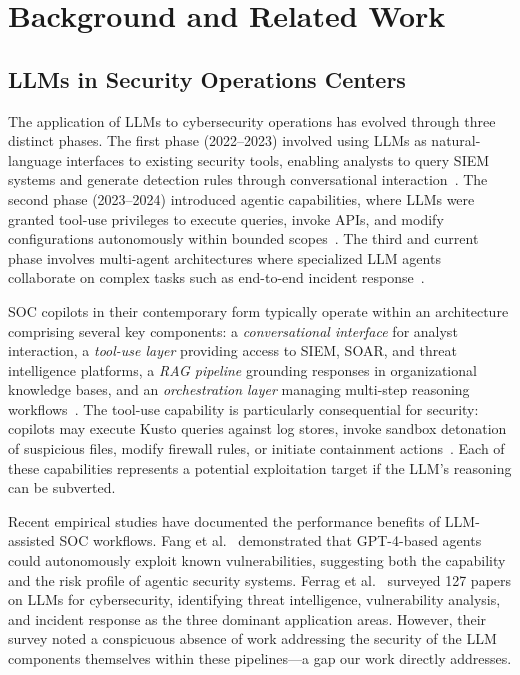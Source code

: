 \documentclass[journal,twoside]{IEEEtran}
\begin{document}
\section{Background and Related Work}
\label{sec:background}

\subsection{LLMs in Security Operations Centers}
\label{sec:bg_soc}

The application of LLMs to cybersecurity operations has evolved through three distinct phases. The first phase (2022--2023) involved using LLMs as natural-language interfaces to existing security tools, enabling analysts to query SIEM systems and generate detection rules through conversational interaction~\cite{ferrag2024llmcyber}. The second phase (2023--2024) introduced agentic capabilities, where LLMs were granted tool-use privileges to execute queries, invoke APIs, and modify configurations autonomously within bounded scopes~\cite{fang2024llmagents}. The third and current phase involves multi-agent architectures where specialized LLM agents collaborate on complex tasks such as end-to-end incident response~\cite{wu2024autogen,hong2024metagpt}.

SOC copilots in their contemporary form typically operate within an architecture comprising several key components: a \emph{conversational interface} for analyst interaction, a \emph{tool-use layer} providing access to SIEM, SOAR, and threat intelligence platforms, a \emph{RAG pipeline} grounding responses in organizational knowledge bases, and an \emph{orchestration layer} managing multi-step reasoning workflows~\cite{microsoft2024copilot}. The tool-use capability is particularly consequential for security: copilots may execute Kusto queries against log stores, invoke sandbox detonation of suspicious files, modify firewall rules, or initiate containment actions~\cite{xu2024llmsec}. Each of these capabilities represents a potential exploitation target if the LLM's reasoning can be subverted.

Recent empirical studies have documented the performance benefits of LLM-assisted SOC workflows. Fang et al.~\cite{fang2024llmagents} demonstrated that GPT-4-based agents could autonomously exploit known vulnerabilities, suggesting both the capability and the risk profile of agentic security systems. Ferrag et al.~\cite{ferrag2024llmcyber} surveyed 127 papers on LLMs for cybersecurity, identifying threat intelligence, vulnerability analysis, and incident response as the three dominant application areas. However, their survey noted a conspicuous absence of work addressing the security of the LLM components themselves within these pipelines---a gap our work directly addresses.
\end{document}
